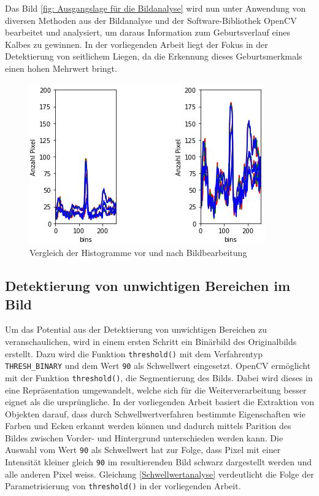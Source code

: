 Das Bild \ref{fig: Ausgangslage für die Bildanalyse} wird nun unter Anwendung von diversen Methoden aus der Bildanalyse und der Software-Bibliothek OpenCV bearbeitet und analysiert, um daraus Information zum Geburtsverlauf eines Kalbes zu gewinnen. In der vorliegenden Arbeit liegt der Fokus in der Detektierung von seitlichem Liegen, da die Erkennung dieses Geburtsmerkmals einen hohen Mehrwert bringt. 

\begin{figure}[H]
	\center
	\includegraphics[scale=0.9]{Grafiken/entwicklung/2HistrogrammVergleich.jpg}
	\caption{Vergleich der Histogramme vor und nach Bildbearbeitung} 
	\label{fig: Vergleich der Histogramme vor und nach Bildbearbeitung}
\end{figure}

\subsection{Detektierung von unwichtigen Bereichen im Bild}
Um das Potential aus der Detektierung von unwichtigen Bereichen zu veranschaulichen, wird in einem ersten Schritt ein Binärbild des Originalbilds erstellt. Dazu wird die Funktion \texttt{threshold()} mit dem Verfahrentyp \texttt{THRESH_BINARY} und dem Wert \texttt{90} als Schwellwert eingesetzt. OpenCV ermöglicht mit der Funktion \texttt{threshold()}, die Segmentierung des Bilds. Dabei wird dieses in eine Repräsentation umgewandelt, welche sich für die Weiterverarbeitung besser eignet als die ursprüngliche. \cite[S.328-335]{FernandezVillan2019} In der vorliegenden Arbeit basiert die Extraktion von Objekten darauf, dass durch Schwellwertverfahren bestimmte Eigenschaften wie Farben und Ecken erkannt werden können und dadurch mittels Parition des Bildes zwischen Vorder- und Hintergrund unterschieden werden kann. Die Auswahl vom Wert \texttt{90} als Schwellwert hat zur Folge, dass Pixel mit einer Intensität kleiner gleich \texttt{90} im resultierenden Bild schwarz dargestellt werden und alle anderen Pixel weiss. Gleichung \ref{Schwellwertanalyse} verdeutlicht die Folge der Parametrisierung von \texttt{threshold()} in der vorliegenden Arbeit. 

